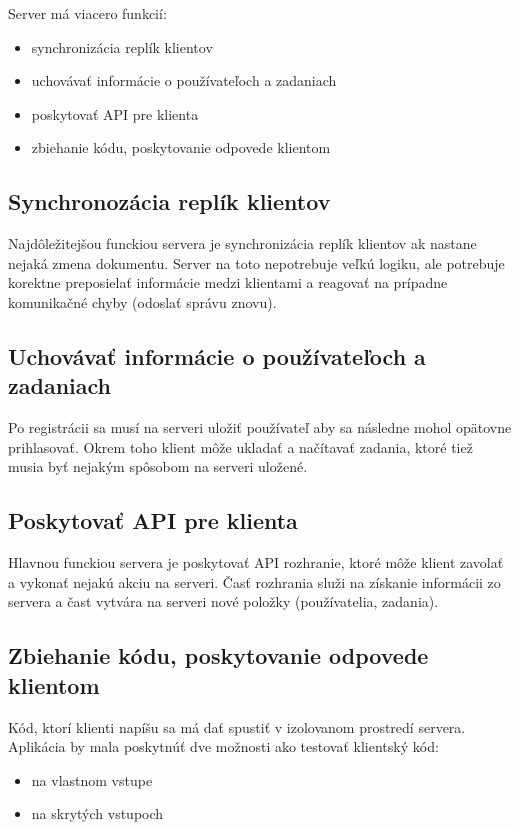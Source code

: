 Server má viacero funkcií:
\begin{itemize}
\item synchronizácia replík klientov
\item uchovávať informácie o používateľoch a zadaniach
\item poskytovať API pre klienta
\item zbiehanie kódu, poskytovanie odpovede klientom
\end{itemize}

\subsection{Synchronozácia replík klientov}
Najdôležitejšou funckiou servera je synchronizácia replík klientov ak nastane nejaká zmena
dokumentu. Server na toto nepotrebuje veľkú logiku, ale potrebuje korektne preposielať informácie
medzi klientami a reagovať na prípadne komunikačné chyby (odoslať správu znovu).

\subsection{Uchovávať informácie o používateľoch a zadaniach}
Po registrácii sa musí na serveri uložiť používateľ aby sa následne mohol opätovne prihlasovať.
Okrem toho klient môže ukladať a načítavať zadania, ktoré tiež musia byť nejakým spôsobom na
serveri uložené.

\subsection{Poskytovať API pre klienta}
Hlavnou funckiou servera je poskytovať API rozhranie, ktoré môže klient zavolať a vykonať nejakú
akciu na serveri. Časť rozhrania služi na získanie informácii zo servera a čast vytvára
na serveri nové položky (používatelia, zadania).

\subsection{Zbiehanie kódu, poskytovanie odpovede klientom}
Kód, ktorí klienti napíšu sa má dať spustiť v izolovanom prostredí servera. Aplikácia by mala
poskytnúť dve možnosti ako testovať klientský kód:
\begin{itemize}
\item na vlastnom vstupe
\item na skrytých vstupoch
\end{itemize}

